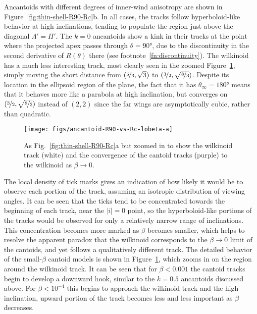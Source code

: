 \documentclass[useAMS, usenatbib, a4paper]{mnras}
\providecommand{\abs}[1]{\lvert#1\rvert}
\begin{document}
Ancantoids with different degrees of inner-wind anisotropy are shown
in Figure~\ref{fig:thin-shell-R90-Rc}b.  In all cases, the tracks
follow hyperboloid-like behavior at high inclinations, tending to
populate the region just above the diagonal \(\Lambda' = \Pi'\).  The
\(k = 0\) ancantoids show a kink in their tracks at the point where
the projected apex passes through \(\theta = \ang{90}\), due to the
discontinuity in the second derivative of \(R(\theta)\) there (see
footnote~\ref{fn:discontinuity}).  The wilkinoid has a much less
interesting track, most clearly seen in the zoomed
Figure~\ref{fig:convergence-cantoid-wilkinoid}, simply moving the
short distance from \((\nicefrac53, \sqrt3)\) to
\((\nicefrac32, \smash{\sqrt{\nicefrac83}})\).  Despite its location
in the ellipsoid region of the plane, the fact that it has
\(\theta_\infty = \ang{180}\) means that it behaves more like a parabola at high
inclination, but converges on
\((\nicefrac32, \smash{\sqrt{\nicefrac83}})\) instead of \((2, 2)\)
since the far wings are asymptotically cubic, rather than quadratic.

\begin{figure}
  \centering
  \texttt{[image: figs/ancantoid-R90-vs-Rc-lobeta-a]}
  \caption[]{As Fig.~\ref{fig:thin-shell-R90-Rc}a but zoomed in to show
    the wilkinoid track (white) and the convergence of the cantoid
    tracks (purple) to the wilkinoid as \(\beta \to 0\).}
  \label{fig:convergence-cantoid-wilkinoid}
\end{figure}

The local density of tick marks gives an indication of how likely it
would be to observe each portion of the track, assuming an isotropic
distribution of viewing angles.  It can be seen that the ticks tend to
be concentrated towards the beginning of each track, near the
\(\abs{i} = 0\) point, so the hyperboloid-like portions of the tracks
would be observed for only a relatively narrow range of inclinations.
This concentration becomes more marked as \(\beta\) becomes smaller, which
helps to resolve the apparent paradox that the wilkinoid corresponds
to the \(\beta \to 0\) limit of the cantoids, and yet follows a
qualitatively different track.  The detailed behavior of the
small-\(\beta\) cantoid models is shown in
Figure~\ref{fig:convergence-cantoid-wilkinoid}, which zooms in on the
region around the wilkinoid track.  It can be seen that for
\(\beta < 0.001\) the cantoid tracks begin to develop a downward hook,
similar to the \(k = 0.5\) ancantoids discussed above.  For
\(\beta < 10^{-4}\) this begins to approach the wilkinoid track and the
high inclination, upward portion of the track becomes less and less
important as \(\beta\) decreases.
\end{document}
